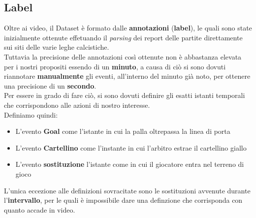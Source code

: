 \subsection{Label}
Oltre ai video, il Dataset è formato dalle \textbf{annotazioni} (\textbf{label}), le quali sono state inizialmente ottenute effetuando il \textit{parsing} dei report delle partite direttamente sui siti delle varie leghe calcistiche.
\\Tuttavia la precisione delle annotazioni così ottenute non è abbastanza elevata per i nostri propositi essendo di un \textbf{minuto}, a causa di ciò si sono dovuti riannotare \textbf{manualmente} gli eventi, all'interno del minuto già noto, per ottenere una precisione di un \textbf{secondo}.
\\Per essere in grado di fare ciò, si sono dovuti definire gli esatti istanti temporali che corrispondono alle azioni di nostro interesse.
\\Definiamo quindi:
\begin{itemize}
\item L'evento \textbf{Goal} come l'istante in cui la palla oltrepassa la linea di porta
\item L'evento \textbf{Cartellino} come l'instante in cui l'arbitro estrae il cartellino giallo
\item L'evento \textbf{sostituzione} l'istante come in cui il giocatore entra nel terreno di gioco
\end{itemize}
L'unica eccezione alle definizioni sovracitate sono le sostituzioni avvenute durante l'\textbf{intervallo}, per le quali è impossibile dare una definzione che corrisponda con quanto accade in video.
